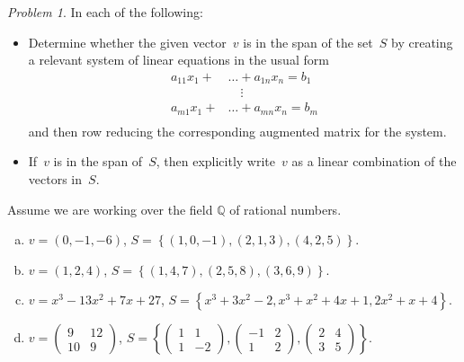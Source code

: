 \documentclass[11pt,twoside]{amsart}
\theoremstyle{plain}
\theoremstyle{remark}
\newtheorem{prob}{Problem}
\theoremstyle{definition}
\theoremstyle{definition}
\newcommand{\Q}{\mathbb{Q}}
\begin{document}
\begin{prob}
In each of the following:
    \begin{itemize}
      \item Determine whether the given vector~$v$ is in the span of the
  set~$S$ by creating a relevant system of linear equations in the usual form
  \begin{align*}
    a_{11}x_1+&\dots+a_{1n}x_n = b_1\\
    &\quad\vdots\\
    a_{m1}x_1+&\dots+a_{mn}x_n = b_m\\
  \end{align*}
  and then row reducing the corresponding augmented matrix for the system.
      \item If~$v$ is in the span of~$S$, then explicitly write~$v$ as a linear
  combination of the vectors in~$S$.
    \end{itemize} 
    Assume we are working over the field $\Q$ of rational numbers.
    \begin{enumerate}[(a)]
      \item $v=(0,-1,-6)$, $S=\left\{ (1,0,-1), (2,1,3), (4,2,5) \right\}$.
      \item $v=(1,2,4)$, $S=\left\{ (1,4,7),(2,5,8),(3,6,9) \right\}$.
      \item $v=x^3-13x^2+7x+27$, $S=\left\{ x^3+3x^2-2, x^3+x^2+4x+1,2x^2+x+4 \right\}$.
      \item $v=\left(\begin{array}{rrr}9&12\\10& 9 \end{array}\right)$, 
  $S=\left\{ 
    \left(\begin{array}{rrr}1&1\\1&-2 \end{array}\right),
    \left(\begin{array}{rrr}-1&2\\1& 2 \end{array}\right),
    \left(\begin{array}{rrr}2&4\\3& 5 \end{array}\right)
  \right\}$.
    \end{enumerate}
\end{prob}

\end{document}
